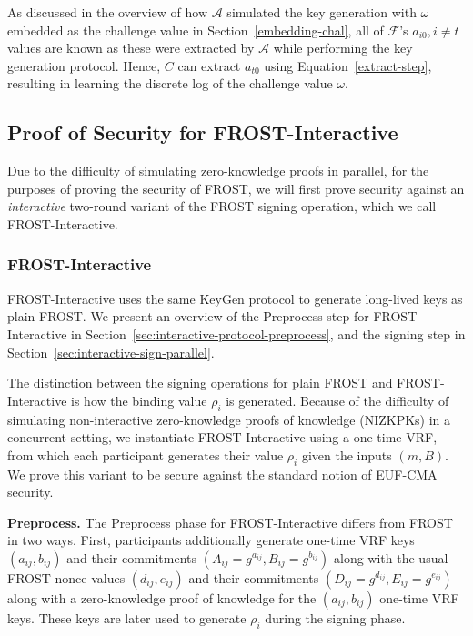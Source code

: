 As discussed in the overview of how $\mathcal{A}$ simulated the key generation
with $\omega$ embedded as the challenge value in Section~\ref{embedding-chal},
all of $\mathcal{F}$'s $a_{i0}, i \neq t$ values are known as these were
extracted by $\mathcal{A}$ while performing the key generation protocol.
Hence, $C$ can extract $a_{t0}$ using
Equation~\ref{extract-step}, resulting in learning the discrete log of the
challenge value $\omega$.

\subsection{Proof of Security for FROST-Interactive}
\label{full-proof-frost-interactive}

Due to the difficulty of simulating zero-knowledge proofs in parallel, for the
purposes of proving the security of FROST, we will first prove
security against an
\emph{interactive} two-round variant of the FROST signing operation,
which we call FROST-Interactive.

\subsubsection{FROST-Interactive}
\label{frost-interactive-parallel}

FROST-Interactive uses the same
KeyGen protocol to generate long-lived keys as plain FROST.
We present an overview of the Preprocess step for FROST-Interactive in
Section~\ref{sec:interactive-protocol-preprocess}, and the signing step in
Section~\ref{sec:interactive-sign-parallel}.

The distinction between the signing operations for plain FROST and
FROST-Inter\-active is how the binding value $\rho_i$ is generated.
Because of the difficulty of
simulating non-interactive zero-knowledge proofs of knowledge (NIZKPKs) in a concurrent setting, we
instantiate FROST-Interactive using a one-time VRF, from which each participant
generates their value $\rho_i$ given the inputs $(m, B)$. We prove this variant
to be secure against the standard notion of EUF-CMA security.

\textbf{Preprocess.} The Preprocess phase for FROST-Interactive
differs from FROST in two ways. First, participants
additionally generate one-time VRF keys $(a_{ij}, b_{ij})$ and their commitments $(A_{ij} = g^{a_{ij}}, B_{ij} = g^{b_{ij}})$ along with the usual FROST nonce
values $(d_{ij}, e_{ij})$ and their commitments $(D_{ij} = g^{d_{ij}},
E_{ij} = g^{e_{ij}})$ along with a zero-knowledge proof of knowledge for the
$(a_{ij}, b_{ij})$ one-time VRF keys. These keys are later used to
generate $\rho_i$ during the signing phase.

